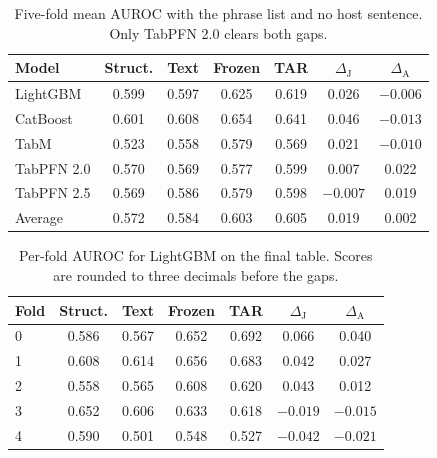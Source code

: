 \documentclass{article}
\begin{document}
\begin{table}[H]
\centering
\caption{Five-fold mean AUROC with the phrase list and no host sentence. Only TabPFN 2.0 clears both gaps.}
\label{tab:phrases}
\small
\setlength{\tabcolsep}{4pt}
\begin{tabular}{lcccccc}
\toprule
Model & Struct. & Text & Frozen & TAR & $\Delta_{\mathrm{J}}$ & $\Delta_{\mathrm{A}}$ \\
\midrule
LightGBM & 0.599 & 0.597 & 0.625 & 0.619 & 0.026 & $-0.006$ \\
CatBoost & 0.601 & 0.608 & 0.654 & 0.641 & 0.046 & $-0.013$ \\
TabM & 0.523 & 0.558 & 0.579 & 0.569 & 0.021 & $-0.010$ \\
TabPFN 2.0 & 0.570 & 0.569 & 0.577 & 0.599 & 0.007 & 0.022 \\
TabPFN 2.5 & 0.569 & 0.586 & 0.579 & 0.598 & $-0.007$ & 0.019 \\
\midrule
Average & 0.572 & 0.584 & 0.603 & 0.605 & 0.019 & 0.002 \\
\bottomrule
\end{tabular}
\end{table}

\begin{table}[H]
\centering
\caption{Per-fold AUROC for LightGBM on the final table. Scores are rounded to three decimals before the gaps.}
\label{tab:lightfolds}
\small
\setlength{\tabcolsep}{4pt}
\begin{tabular}{lcccccc}
\toprule
Fold & Struct. & Text & Frozen & TAR & $\Delta_{\mathrm{J}}$ & $\Delta_{\mathrm{A}}$ \\
\midrule
0 & 0.586 & 0.567 & 0.652 & 0.692 & 0.066 & 0.040 \\
1 & 0.608 & 0.614 & 0.656 & 0.683 & 0.042 & 0.027 \\
2 & 0.558 & 0.565 & 0.608 & 0.620 & 0.043 & 0.012 \\
3 & 0.652 & 0.606 & 0.633 & 0.618 & $-0.019$ & $-0.015$ \\
4 & 0.590 & 0.501 & 0.548 & 0.527 & $-0.042$ & $-0.021$ \\
\bottomrule
\end{tabular}
\end{table}
\end{document}
